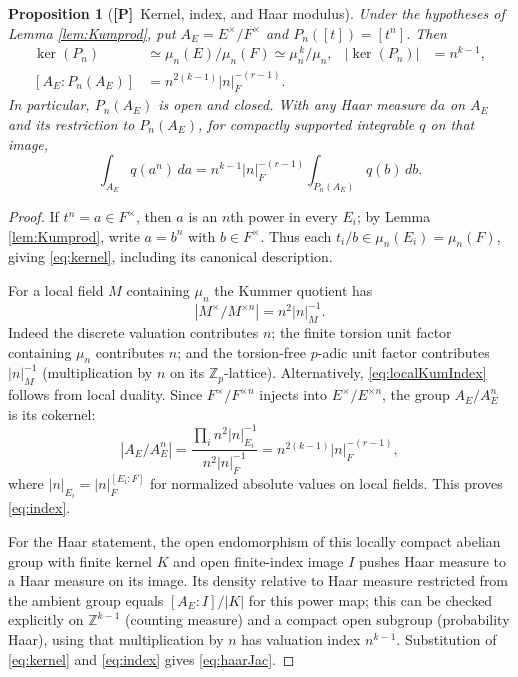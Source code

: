 \documentclass[11pt]{article}
\newcommand{\Z}{\mathbb Z}
\newcommand{\Ptag}{\textnormal{\textbf{[P]}}}
\theoremstyle{plain}
\newtheorem{proposition}[theorem]{Proposition}
\theoremstyle{definition}
\begin{document}
\begin{proposition}[\Ptag\ Kernel, index, and Haar modulus]\label{prop:power-etale}
Under the hypotheses of Lemma \ref{lem:Kumprod}, put
$A_E=E^\times/F^\times$ and $P_n([t])=[t^n]$.  Then
\begin{align}
 \ker(P_n)&\simeq \mu_n(E)/\mu_n(F)
      \simeq \mu_n^{\,k}/\mu_n,
 &|\ker(P_n)|&=n^{k-1},\label{eq:kernel}\\
 [A_E:P_n(A_E)]&=n^{2(k-1)}|n|_F^{-(r-1)}.
 \label{eq:index}
\end{align}
In particular, $P_n(A_E)$ is open and closed.  With \emph{any}
Haar measure $da$ on $A_E$ and its restriction to $P_n(A_E)$,
for compactly supported integrable $q$ on that image,
\begin{equation}\label{eq:haarJac}
 \int_{A_E}q(a^n)\,da
 =n^{k-1}|n|_F^{-(r-1)}
   \int_{P_n(A_E)}q(b)\,db.
\end{equation}
\end{proposition}
\begin{proof}
If $t^n=a\in F^\times$, then $a$ is an $n$th power in every
$E_i$; by Lemma \ref{lem:Kumprod}, write $a=b^n$ with $b\in F^\times$.
Thus each $t_i/b\in\mu_n(E_i)=\mu_n(F)$, giving
\eqref{eq:kernel}, including its canonical description.

For a local field $M$ containing $\mu_n$ the Kummer quotient has
\begin{equation}\label{eq:localKumIndex}
 |M^\times/M^{\times n}|=n^2|n|_M^{-1}.
\end{equation}
Indeed the discrete valuation contributes $n$; the finite
torsion unit factor containing $\mu_n$ contributes $n$; and
the torsion-free $p$-adic unit factor contributes
$|n|_M^{-1}$ (multiplication by $n$ on its $\Z_p$-lattice).  Alternatively, \eqref{eq:localKumIndex}
follows from local duality.
Since $F^\times/F^{\times n}$ injects into
$E^\times/E^{\times n}$, the group $A_E/A_E^n$ is its cokernel:
\[
 |A_E/A_E^n|
 =\frac{\prod_i n^2|n|_{E_i}^{-1}}
             {n^2|n|_F^{-1}}
 =n^{2(k-1)}|n|_F^{-(r-1)},
\]
where $|n|_{E_i}=|n|_F^{[E_i:F]}$ for normalized absolute values
on local fields.  This proves \eqref{eq:index}.

For the Haar statement, the open endomorphism of this locally compact
abelian group with finite kernel $K$ and open finite-index image
$I$ pushes Haar measure to a Haar measure on its image.  Its density
relative to Haar measure restricted from the ambient group equals
$[A_E:I]/|K|$ for this power map; this can be checked explicitly
on $\mathbb Z^{k-1}$ (counting measure) and a compact open subgroup
(probability Haar), using that multiplication by $n$ has valuation
index $n^{k-1}$.  Substitution of \eqref{eq:kernel} and
\eqref{eq:index} gives \eqref{eq:haarJac}.
\end{proof}
\end{document}
